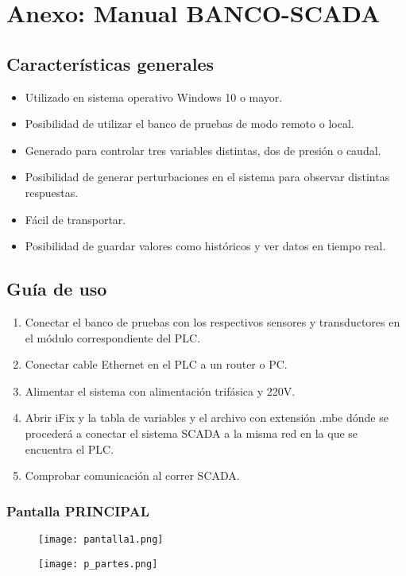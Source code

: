\newpage

\section{Anexo: Manual BANCO-SCADA}
\subsection{Características generales}
\begin{itemize}
	\item Utilizado en sistema operativo Windows 10 o mayor.
	\item Posibilidad de utilizar el banco de pruebas de modo remoto o local.
	\item Generado para controlar tres variables distintas, dos de presión o caudal.
\item Posibilidad de generar perturbaciones en el sistema para observar distintas respuestas.
	\item Fácil de transportar.
\item Posibilidad de guardar valores como históricos y ver datos en tiempo real.
\end{itemize}


\subsection{Guía de uso}
\begin{enumerate}
	\item Conectar el banco de pruebas con los respectivos sensores y transductores en el módulo correspondiente del PLC.
	\item Conectar cable Ethernet en el PLC a un router o PC.
	\item Alimentar el sistema con alimentación trifásica y 220V.
	\item Abrir iFix y la tabla de variables y el archivo con extensión .mbe dónde se procederá a conectar el sistema SCADA a la misma red en la que se encuentra el PLC.
	\item Comprobar comunicación al correr SCADA.
\end{enumerate}

\subsubsection{Pantalla PRINCIPAL}

\begin{figure}[h!]
	\centering
	\texttt{[image: pantalla1.png]}
	\label{fig:pantalla1}
\end{figure}
\begin{figure}[h!]
	\centering
	\texttt{[image: p\_partes.png]}
	\label{fig:partes}
\end{figure}

